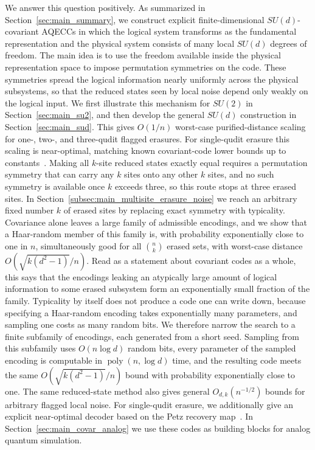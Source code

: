 \documentclass[10pt,twocolumn,superscriptaddress,aps,amsmath,amssymb,citeautoscript,floatfix,prx]{revtex4-2}
\theoremstyle{plain}
\theoremstyle{plain}
\theoremstyle{plain}
\theoremstyle{plain}
\theoremstyle{plain}
\theoremstyle{plain}
\theoremstyle{plain}
\theoremstyle{definition}
\theoremstyle{plain}
\begin{document}
We answer this question positively. As summarized in Section~\ref{sec:main_summary}, we construct explicit finite-dimensional $SU(d)$-covariant AQECCs in which the logical system transforms as the fundamental representation and the physical system consists of many local $SU(d)$ degrees of freedom. 
The main idea is to use the freedom available inside the physical representation space to impose permutation symmetries on the code. These symmetries spread the logical information nearly uniformly across the physical subsystems, so that the reduced states seen by local noise depend only weakly on the logical input. 
We first illustrate this mechanism for $SU(2)$ in Section~\ref{sec:main_su2}, and then develop the general $SU(d)$ construction in Section~\ref{sec:main_sud}. 
This gives $O(1/n)$ worst-case purified-distance scaling for one-, two-, and three-qudit flagged erasures. For single-qudit erasure this scaling is near-optimal, matching known covariant-code lower bounds up to constants~\cite{Faist2020,Zhou2021}. 
Making all $k$-site reduced states exactly equal requires a permutation symmetry that can carry any $k$ sites onto any other $k$ sites, and no such symmetry is available once $k$ exceeds three, so this route stops at three erased sites. In Section~\ref{subsec:main_multisite_erasure_noise} we reach an arbitrary fixed number $k$ of erased sites by replacing exact symmetry with typicality. 
Covariance alone leaves a large family of admissible encodings, and we show that a Haar-random member of this family is, with probability exponentially close to one in $n$, simultaneously good for all $\binom nk$ erased sets, with worst-case distance $O(\sqrt{k(d^2-1)}/n)$.
Read as a statement about covariant codes as a whole, this says that the encodings leaking an atypically large amount of logical information to some erased subsystem form an exponentially small fraction of the family. 
Typicality by itself does not produce a code one can write down, because specifying a Haar-random encoding takes exponentially many parameters, and sampling one costs as many random bits. We therefore narrow the search to a finite subfamily of encodings, each generated from a short seed.
Sampling from this subfamily uses $O(n\log d)$ random bits, every parameter of the sampled encoding is computable in $\operatorname{poly}(n,\log d)$ time, and the resulting code meets the same $O(\sqrt{k(d^2-1)}/n)$ bound with probability exponentially close to one. The same reduced-state 
method also gives general $O_{d,k}(n^{-1/2})$ bounds for arbitrary flagged local noise. For single-qudit erasure, we additionally give an explicit near-optimal decoder based on the Petz recovery map~\cite{Petz1988,Barnum2002,Ng2010}. In Section~\ref{sec:main_covar_analog} we use these codes as building blocks for analog quantum simulation. 
\end{document}
